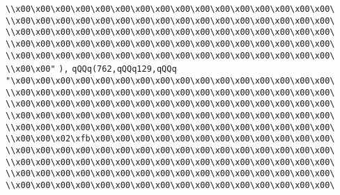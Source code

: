 \verb|\\x00\x00\x00\x00\x00\x00\x00\x00\x00\x00\x00\x00\x00\x00\x00\x00\|\newline
\verb|\\x00\x00\x00\x00\x00\x00\x00\x00\x00\x00\x00\x00\x00\x00\x00\x00\|\newline
\verb|\\x00\x00\x00\x00\x00\x00\x00\x00\x00\x00\x00\x00\x00\x00\x00\x00\|\newline
\verb|\\x00\x00\x00\x00\x00\x00\x00\x00\x00\x00\x00\x00\x00\x00\x00\x00\|\newline
\verb|\\x00\x00\x00\x00\x00\x00\x00\x00\x00\x00\x00\x00\x00\x00\x00\x00\|\newline
\verb|\\x00\x00"|\newline
\verb|),|\newline
\verb|qQQq(762,qQQq129,qQQq|\newline
\verb|"\x00\x00\x00\x00\x00\x00\x00\x00\x00\x00\x00\x00\x00\x00\x00\x00\|\newline
\verb|\\x00\x00\x00\x00\x00\x00\x00\x00\x00\x00\x00\x00\x00\x00\x00\x00\|\newline
\verb|\\x00\x00\x00\x00\x00\x00\x00\x00\x00\x00\x00\x00\x00\x00\x00\x00\|\newline
\verb|\\x00\x00\x00\x00\x00\x00\x00\x00\x00\x00\x00\x00\x00\x00\x00\x00\|\newline
\verb|\\x00\x00\x00\x00\x00\x00\x00\x00\x00\x00\x00\x00\x00\x00\x00\x00\|\newline
\verb|\\x00\x00\x02\xfb\x00\x00\x00\x00\x00\x00\x00\x00\x00\x00\x00\x00\|\newline
\verb|\\x00\x00\x00\x00\x00\x00\x00\x00\x00\x00\x00\x00\x00\x00\x00\x00\|\newline
\verb|\\x00\x00\x00\x00\x00\x00\x00\x00\x00\x00\x00\x00\x00\x00\x00\x00\|\newline
\verb|\\x00\x00\x00\x00\x00\x00\x00\x00\x00\x00\x00\x00\x00\x00\x00\x00\|\newline
\verb|\\x00\x00\x00\x00\x00\x00\x00\x00\x00\x00\x00\x00\x00\x00\x00\x00\|\newline
